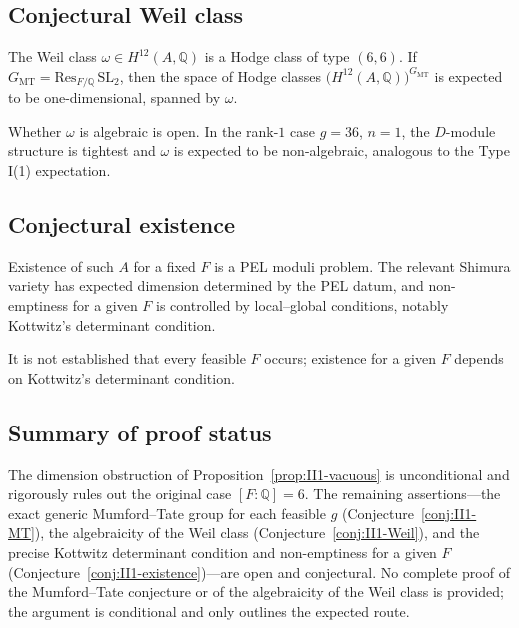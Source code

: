 \documentclass{article}
\begin{document}
\subsection{Conjectural Weil class}
\label{sec:II1-Weil}

The Weil class $\omega \in H^{12}(A,\mathbb{Q})$ is a Hodge class of type
$(6,6)$. If $G_{\mathrm{MT}} = \mathrm{Res}_{F/\mathbb{Q}}\,\mathrm{SL}_2$,
then the space of Hodge classes
$\bigl(H^{12}(A,\mathbb{Q})\bigr)^{G_{\mathrm{MT}}}$ is expected to be
one-dimensional, spanned by $\omega$.

\begin{conjecture}
\label{conj:II1-Weil}
Whether $\omega$ is algebraic is open. In the rank-$1$ case $g=36$,
$n=1$, the $D$-module structure is tightest and $\omega$ is expected to be
non-algebraic, analogous to the Type I(1) expectation.
\end{conjecture}

\subsection{Conjectural existence}
\label{sec:II1-existence}

Existence of such $A$ for a fixed $F$ is a PEL moduli problem. The
relevant Shimura variety has expected dimension determined by the PEL
datum, and non-emptiness for a given $F$ is controlled by local--global
conditions, notably Kottwitz's determinant condition.

\begin{conjecture}
\label{conj:II1-existence}
It is not established that every feasible $F$ occurs; existence for a
given $F$ depends on Kottwitz's determinant condition.
\end{conjecture}

\subsection{Summary of proof status}
\label{sec:II1-summary}

The dimension obstruction of Proposition~\ref{prop:II1-vacuous} is
unconditional and rigorously rules out the original case
$[F:\mathbb{Q}] = 6$. The remaining assertions---the exact generic
Mumford--Tate group for each feasible $g$
(Conjecture~\ref{conj:II1-MT}), the algebraicity of the Weil class
(Conjecture~\ref{conj:II1-Weil}), and the precise Kottwitz determinant
condition and non-emptiness for a given $F$
(Conjecture~\ref{conj:II1-existence})---are open and conjectural. No
complete proof of the Mumford--Tate conjecture or of the algebraicity of
the Weil class is provided; the argument is conditional and only outlines
the expected route.
\end{document}

